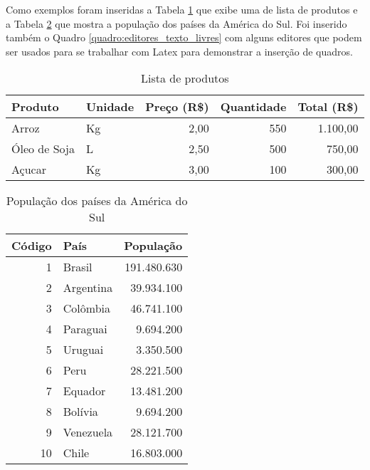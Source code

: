 Como exemplos foram inseridas a Tabela \ref{tabela:lista_produtos} que exibe uma de lista de produtos e a Tabela \ref{tabela:populacao_america_sul} que mostra a população dos países da América do Sul. Foi inserido também o Quadro \ref{quadro:editores_texto_livres} com alguns editores que podem ser usados para se trabalhar com Latex para demonstrar a inserção de quadros.

\begin{table}[!htb]
\caption{Lista de produtos} \label{tabela:lista_produtos}
\begin{tabularx}{\textwidth}{X|l|r|r|r} \hline
Produto      & Unidade & Preço (R\$) & Quantidade & Total (R\$) \\ \hline
Arroz        & Kg      & 2,00        & 550        & 1.100,00    \\
Óleo de Soja & L       & 2,50        & 500        & 750,00      \\
Açucar       & Kg      & 3,00        & 100        & 300,00      \\ \hline
\end{tabularx}
\end{table}

\begin{table}[!htb] \centering
\caption{População dos países da América do Sul} \label{tabela:populacao_america_sul}
\begin{varwidth}{\linewidth}
\begin{tabular}{r|l|r}        \hline
Código  & País            & População   \\ \hline
1       & Brasil          & 191.480.630 \\
2       & Argentina       &  39.934.100 \\
3       & Colômbia        &  46.741.100 \\
4       & Paraguai        &   9.694.200 \\
5       & Uruguai         &   3.350.500 \\
6       & Peru            &  28.221.500 \\
7       & Equador         &  13.481.200 \\
8       & Bolívia         &   9.694.200 \\
9       & Venezuela       &  28.121.700 \\
10      & Chile           &  16.803.000 \\ \hline
\end{tabular}
\end{varwidth}
\end{table}

